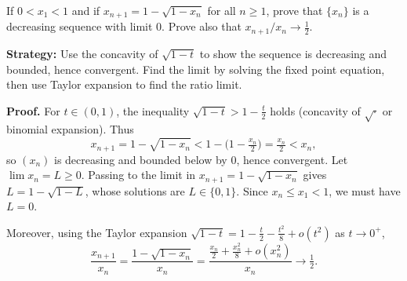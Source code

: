\begin{problembox}
\begin{problemstatement}
If $0 < x_1 < 1$ and if $x_{n+1} = 1 - \sqrt{1 - x_n}$ for all $n \geq 1$, prove that $\{x_n\}$ is a decreasing sequence with limit 0. Prove also that $x_{n+1}/x_n \to \frac{1}{2}$.
\end{problemstatement}
\end{problembox}

\noindent\textbf{Strategy:} Use the concavity of $\sqrt{1-t}$ to show the sequence is decreasing and bounded, hence convergent. Find the limit by solving the fixed point equation, then use Taylor expansion to find the ratio limit.

\noindent\textbf{Proof.}
For $t\in(0,1)$, the inequality $\sqrt{1-t}>1-\tfrac{t}{2}$ holds (concavity of $\sqrt{\cdot}$ or binomial expansion). Thus
\[
x_{n+1}=1-\sqrt{1-x_n}<1-\Big(1-\tfrac{x_n}{2}\Big)=\tfrac{x_n}{2}<x_n,
\]
so $(x_n)$ is decreasing and bounded below by $0$, hence convergent. Let $\lim x_n=L\ge 0$. Passing to the limit in $x_{n+1}=1-\sqrt{1-x_n}$ gives $L=1-\sqrt{1-L}$, whose solutions are $L\in\{0,1\}$. Since $x_n\le x_1<1$, we must have $L=0$.

Moreover, using the Taylor expansion $\sqrt{1-t}=1-\tfrac{t}{2}-\tfrac{t^2}{8}+o(t^2)$ as $t\to 0^+$,
\[
\frac{x_{n+1}}{x_n}=\frac{1-\sqrt{1-x_n}}{x_n}=\frac{\tfrac{x_n}{2}+\tfrac{x_n^2}{8}+o(x_n^2)}{x_n}\to \tfrac12.
\]

